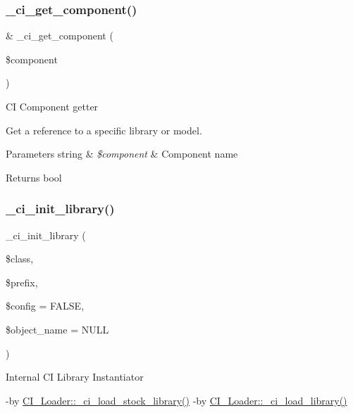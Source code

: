 \subsubsection{\texorpdfstring{\+\_\+ci\+\_\+get\+\_\+component()}{\_ci\_get\_component()}}
{\footnotesize\ttfamily \& \+\_\+ci\+\_\+get\+\_\+component (\begin{DoxyParamCaption}\item[{}]{\$component }\end{DoxyParamCaption})\hspace{0.3cm}{\ttfamily [protected]}}

CI Component getter

Get a reference to a specific library or model.


\begin{DoxyParams}[1]{Parameters}
string & {\em \$component} & Component name \\
\hline
\end{DoxyParams}
\begin{DoxyReturn}{Returns}
bool 
\end{DoxyReturn}
\mbox{\label{class_c_i___loader_a20ac1358ec26e9951959f26e2c5ca121}} 
\subsubsection{\texorpdfstring{\+\_\+ci\+\_\+init\+\_\+library()}{\_ci\_init\_library()}}
{\footnotesize\ttfamily \+\_\+ci\+\_\+init\+\_\+library (\begin{DoxyParamCaption}\item[{}]{\$class,  }\item[{}]{\$prefix,  }\item[{}]{\$config = {\ttfamily FALSE},  }\item[{}]{\$object\+\_\+name = {\ttfamily NULL} }\end{DoxyParamCaption})\hspace{0.3cm}{\ttfamily [protected]}}

Internal CI Library Instantiator

-\/by \mbox{\hyperlink{class_c_i___loader_aa7c2bf48ad1c415720cd219e23f2d6e2}{C\+I\+\_\+\+Loader\+::\+\_\+ci\+\_\+load\+\_\+stock\+\_\+library()}} -\/by \mbox{\hyperlink{class_c_i___loader_a5ee20a37e1d55db949084f2f5563d2d2}{C\+I\+\_\+\+Loader\+::\+\_\+ci\+\_\+load\+\_\+library()}}


